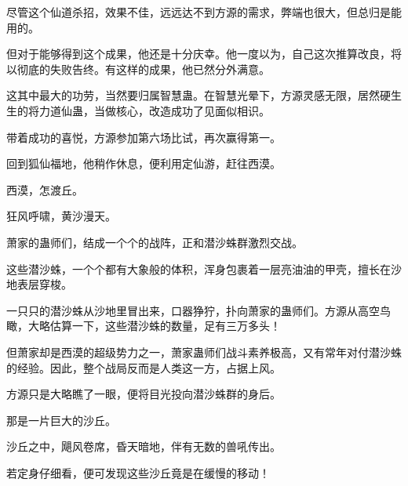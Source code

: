 \begin{this_body}
尽管这个仙道杀招，效果不佳，远远达不到方源的需求，弊端也很大，但总归是能用的。

但对于能够得到这个成果，他还是十分庆幸。他一度以为，自己这次推算改良，将以彻底的失败告终。有这样的成果，他已然分外满意。

这其中最大的功劳，当然要归属智慧蛊。在智慧光晕下，方源灵感无限，居然硬生生的将力道仙蛊，当做核心，改造成功了见面似相识。

带着成功的喜悦，方源参加第六场比试，再次赢得第一。

回到狐仙福地，他稍作休息，便利用定仙游，赶往西漠。

西漠，怎渡丘。

狂风呼啸，黄沙漫天。

萧家的蛊师们，结成一个个的战阵，正和潜沙蛛群激烈交战。

这些潜沙蛛，一个个都有大象般的体积，浑身包裹着一层亮油油的甲壳，擅长在沙地表层穿梭。

一只只的潜沙蛛从沙地里冒出来，口器狰狞，扑向萧家的蛊师们。方源从高空鸟瞰，大略估算一下，这些潜沙蛛的数量，足有三万多头！

但萧家却是西漠的超级势力之一，萧家蛊师们战斗素养极高，又有常年对付潜沙蛛的经验。因此，整个战局反而是人类这一方，占据上风。

方源只是大略瞧了一眼，便将目光投向潜沙蛛群的身后。

那是一片巨大的沙丘。

沙丘之中，飓风卷席，昏天暗地，伴有无数的兽吼传出。

若定身仔细看，便可发现这些沙丘竟是在缓慢的移动！

\end{this_body}

